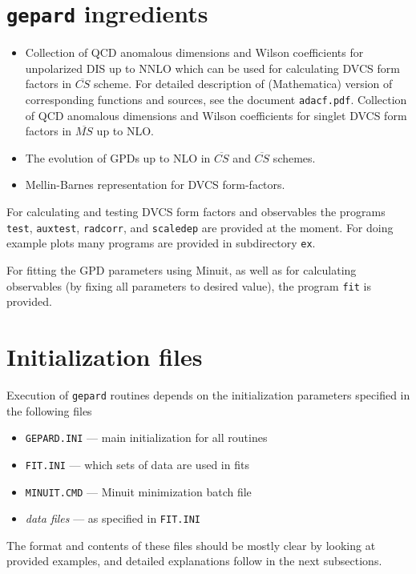 \documentclass[12pt]{article}
\begin{document}
\section{\texttt{gepard} ingredients}

\begin{itemize}
\item Collection of QCD anomalous dimensions and Wilson coefficients for
unpolarized DIS up to NNLO which can be used for calculating DVCS form factors
in $\overline{CS}$ scheme. For detailed description of (Mathematica) version of
corresponding functions and sources, see the document \texttt{adacf.pdf}.
Collection of QCD anomalous dimensions and Wilson coefficients for singlet DVCS form factors
in $\overline{MS}$ up to NLO.

\item
The evolution of GPDs up to NLO in $\overline{CS}$ and  $\overline{CS}$ schemes.

\item 
Mellin-Barnes representation for DVCS form-factors.
\end{itemize}

For calculating and testing DVCS form factors and observables the programs \texttt{test},
\texttt{auxtest}, \texttt{radcorr}, and \texttt{scaledep} are provided at the
moment. For doing example plots many programs are provided in subdirectory \texttt{ex}.

For fitting the GPD parameters using Minuit, as well as for calculating observables (by
fixing all parameters to desired value), the program \texttt{fit} is provided.

\section{Initialization files}
\label{sec:init}

Execution of \texttt{gepard} routines depends on the initialization parameters specified in
the following files
\begin{itemize}
\item  \texttt{GEPARD.INI} --- main initialization for all routines
\item  \texttt{FIT.INI} --- which sets of data are used in fits
\item \texttt{MINUIT.CMD} --- Minuit minimization batch file
\item \emph{data files} --- as specified in \texttt{FIT.INI}
\end{itemize}
The format and contents of these files should be mostly clear by looking at provided
examples, and detailed explanations follow in the next subsections.
\end{document}
